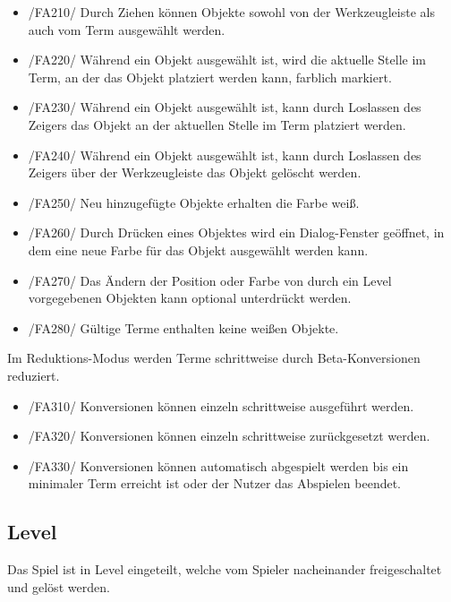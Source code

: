 \begin{itemize}
\item /FA210/ Durch Ziehen können Objekte sowohl von der Werkzeugleiste als auch vom Term ausgewählt werden.
\item /FA220/ Während ein Objekt ausgewählt ist, wird die aktuelle Stelle im Term, an der das Objekt platziert werden kann, farblich markiert.
\item /FA230/ Während ein Objekt ausgewählt ist, kann durch Loslassen des Zeigers das Objekt an der aktuellen Stelle im Term platziert werden.
\item /FA240/ Während ein Objekt ausgewählt ist, kann durch Loslassen des Zeigers über der Werkzeugleiste das Objekt gelöscht werden.
\item /FA250/ Neu hinzugefügte Objekte erhalten die Farbe weiß.
\item /FA260/ Durch Drücken eines Objektes wird ein Dialog-Fenster geöffnet, in dem eine neue Farbe für das Objekt ausgewählt werden kann.
\item /FA270/ Das Ändern der Position oder Farbe von durch ein Level vorgegebenen Objekten kann optional unterdrückt werden.
\item /FA280/ Gültige Terme enthalten keine weißen Objekte.
\end{itemize}

Im Reduktions-Modus werden Terme schrittweise durch Beta-Konversionen reduziert.

\begin{itemize}
\item /FA310/ Konversionen können einzeln schrittweise ausgeführt werden.
\item /FA320/ Konversionen können einzeln schrittweise zurückgesetzt werden.
\item /FA330/ Konversionen können automatisch abgespielt werden bis ein minimaler Term erreicht ist oder der Nutzer das Abspielen beendet.
\end{itemize}

\subsection{Level}

Das Spiel ist in Level eingeteilt, welche vom Spieler nacheinander freigeschaltet und gelöst werden.

